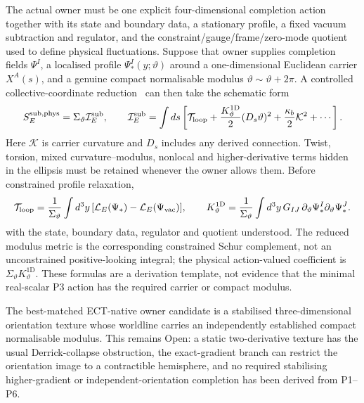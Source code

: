 \documentclass[11pt,a4paper]{article}
\begin{document}
The actual owner must be one explicit four-dimensional completion action
together with its state and boundary data, a stationary profile, a fixed
vacuum subtraction and regulator, and the constraint/gauge/frame/zero-mode
quotient used to define physical fluctuations.  Suppose that owner supplies
completion fields $\Psi^I$, a localised profile
$\Psi_*^I(y;\vartheta)$ around a one-dimensional Euclidean carrier
$X^A(s)$, and a genuine compact normalisable modulus
$\vartheta\sim\vartheta+2\pi$.  A controlled collective-coordinate
reduction~\cite{Manton1982Moduli} can then take the schematic form
\begin{equation}
 S_{E}^{\rm sub,phys}=\Sigma_\vartheta\mathcal I_E^{\rm sub},
 \qquad
 \mathcal I_E^{\rm sub}=\int ds\left[
 \mathcal T_{\rm loop}
 +\frac{K_\vartheta^{1\mathrm D}}{2}(D_s\vartheta)^2
 +\frac{\kappa_b}{2}\mathcal K^2+\cdots\right].
 \label{eq:pop_cde_reduction}
\end{equation}
Here $\mathcal K$ is carrier curvature and $D_s$ includes any derived
connection.  Twist, torsion, mixed curvature--modulus, nonlocal and
higher-derivative terms hidden in the ellipsis must be retained whenever
the owner allows them.  Before constrained profile relaxation,
\begin{equation}
 \mathcal T_{\rm loop}
 =\frac{1}{\Sigma_\vartheta}\int d^3y\,
 [\mathcal L_E(\Psi_*)-\mathcal L_E(\Psi_{\rm vac})],
 \qquad
 K_\vartheta^{1\mathrm D}
 =\frac{1}{\Sigma_\vartheta}\int d^3y\,G_{IJ}\,
 \partial_\vartheta\Psi_*^I\partial_\vartheta\Psi_*^J .
 \label{eq:pop_cde_coefficients}
\end{equation}
with the state, boundary data, regulator and quotient understood.  The
reduced modulus metric is the corresponding constrained Schur
complement, not an unconstrained positive-looking integral; the physical
action-valued coefficient is $\Sigma_\vartheta K_\vartheta^{1\mathrm D}$.  These formulas are a
derivation template, not evidence that the minimal real-scalar P3 action has
the required carrier or compact modulus.

The best-matched ECT-native owner candidate is a stabilised
three-dimensional orientation texture whose worldline carries an
independently established compact normalisable modulus.  This remains Open:
a static two-derivative texture has the usual Derrick-collapse obstruction,
the exact-gradient branch can restrict the orientation image to a
contractible hemisphere, and no required stabilising higher-gradient or
independent-orientation completion has been derived from P1--P6.
\end{document}
